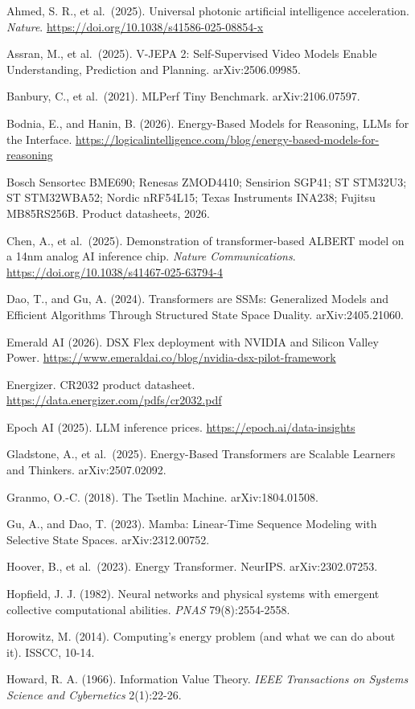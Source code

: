 \documentclass[10pt,letterpaper]{article}
\begin{document}
Ahmed, S. R., et al.~(2025). Universal photonic artificial intelligence
acceleration. \emph{Nature}.
\url{https://doi.org/10.1038/s41586-025-08854-x}

Assran, M., et al.~(2025). V-JEPA 2: Self-Supervised Video Models Enable
Understanding, Prediction and Planning. arXiv:2506.09985.

Banbury, C., et al.~(2021). MLPerf Tiny Benchmark. arXiv:2106.07597.

Bodnia, E., and Hanin, B. (2026). Energy-Based Models for Reasoning,
LLMs for the Interface.
\url{https://logicalintelligence.com/blog/energy-based-models-for-reasoning}

Bosch Sensortec BME690; Renesas ZMOD4410; Sensirion SGP41; ST STM32U3;
ST STM32WBA52; Nordic nRF54L15; Texas Instruments INA238; Fujitsu
MB85RS256B. Product datasheets, 2026.

Chen, A., et al.~(2025). Demonstration of transformer-based ALBERT model
on a 14nm analog AI inference chip. \emph{Nature Communications}.
\url{https://doi.org/10.1038/s41467-025-63794-4}

Dao, T., and Gu, A. (2024). Transformers are SSMs: Generalized Models
and Efficient Algorithms Through Structured State Space Duality.
arXiv:2405.21060.

Emerald AI (2026). DSX Flex deployment with NVIDIA and Silicon Valley
Power. \url{https://www.emeraldai.co/blog/nvidia-dsx-pilot-framework}

Energizer. CR2032 product datasheet.
\url{https://data.energizer.com/pdfs/cr2032.pdf}

Epoch AI (2025). LLM inference prices.
\url{https://epoch.ai/data-insights}

Gladstone, A., et al.~(2025). Energy-Based Transformers are Scalable
Learners and Thinkers. arXiv:2507.02092.

Granmo, O.-C. (2018). The Tsetlin Machine. arXiv:1804.01508.

Gu, A., and Dao, T. (2023). Mamba: Linear-Time Sequence Modeling with
Selective State Spaces. arXiv:2312.00752.

Hoover, B., et al.~(2023). Energy Transformer. NeurIPS.
arXiv:2302.07253.

Hopfield, J. J. (1982). Neural networks and physical systems with
emergent collective computational abilities. \emph{PNAS}
79(8):2554-2558.

Horowitz, M. (2014). Computing's energy problem (and what we can do
about it). ISSCC, 10-14.

Howard, R. A. (1966). Information Value Theory. \emph{IEEE Transactions
on Systems Science and Cybernetics} 2(1):22-26.
\end{document}
